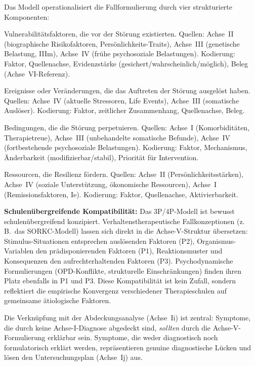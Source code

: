 \documentclass[11pt,a4paper]{article}
\begin{document}
Das Modell operationalisiert die Fallformulierung durch vier strukturierte Komponenten:

\begin{description}[style=nextline, leftmargin=1.5cm, font=\bfseries]
\item[Pr\"adisponierende Faktoren (P1)] Vulnerabilit\"atsfaktoren, die vor der St\"orung existierten. Quellen: Achse~II (biographische Risikofaktoren, Pers\"onlichkeits-Traits), Achse~III (genetische Belastung, IIIm), Achse~IV (fr\"uhe psychosoziale Belastungen). Kodierung: Faktor, Quellenachse, Evidenzst\"arke (gesichert/wahrscheinlich/m\"oglich), Beleg (Achse~VI-Referenz).
\item[Ausl\"osende Faktoren (P2)] Ereignisse oder Ver\"anderungen, die das Auftreten der St\"orung ausgel\"ost haben. Quellen: Achse~IV (aktuelle Stressoren, Life Events), Achse~III (somatische Ausl\"oser). Kodierung: Faktor, zeitlicher Zusammenhang, Quellenachse, Beleg.
\item[Aufrechterhaltende Faktoren (P3)] Bedingungen, die die St\"orung perpetuieren. Quellen: Achse~I (Komorbidit\"aten, Therapietreue), Achse~III (unbehandelte somatische Befunde), Achse~IV (fortbestehende psychosoziale Belastungen). Kodierung: Faktor, Mechanismus, \"Anderbarkeit (modifizierbar/stabil), Priorit\"at f\"ur Intervention.
\item[Protektive Faktoren (P4)] Ressourcen, die Resilienz f\"ordern. Quellen: Achse~II (Pers\"onlichkeitsst\"arken), Achse~IV (soziale Unterst\"utzung, \"okonomische Ressourcen), Achse~I (Remissionsfaktoren, Ie). Kodierung: Faktor, Quellenachse, Aktivierbarkeit.
\end{description}

\textbf{Schulen\"ubergreifende Kompatibilit\"at:} Das 3P/4P-Modell ist bewusst schulen\"ubergreifend konzipiert. Verhaltenstherapeutische Fallkonzeptionen (z.\,B.\ das SORKC-Modell) lassen sich direkt in die Achse-V-Struktur \"ubersetzen: Stimulus-Situationen entsprechen ausl\"osenden Faktoren (P2), Organismus-Variablen den pr\"adisponierenden Faktoren (P1), Reaktionsmuster und Konsequenzen den aufrechterhaltenden Faktoren (P3). Psychodynamische Formulierungen (OPD-Konflikte, strukturelle Einschr\"ankungen) finden ihren Platz ebenfalls in P1 und P3. Diese Kompatibilit\"at ist kein Zufall, sondern reflektiert die empirische Konvergenz verschiedener Therapieschulen auf gemeinsame \"atiologische Faktoren.

Die Verkn\"upfung mit der Abdeckungsanalyse (Achse~Ii) ist zentral: Symptome, die durch keine Achse-I-Diagnose abgedeckt sind, \textit{sollten} durch die Achse-V-Formulierung erkl\"arbar sein. Symptome, die weder diagnostisch noch formulatorisch erkl\"art werden, repr\"asentieren genuine diagnostische L\"ucken und l\"osen den Untersuchungsplan (Achse~Ij) aus.
\end{document}
